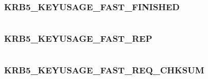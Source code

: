 \documentclass[letterpaper,10pt,english]{sphinxmanual}
\begin{document}
\subsubsection{KRB5\_KEYUSAGE\_FAST\_FINISHED}
\label{appdev/refs/macros/KRB5_KEYUSAGE_FAST_FINISHED:krb5-keyusage-fast-finished-data}\label{appdev/refs/macros/KRB5_KEYUSAGE_FAST_FINISHED::doc}\label{appdev/refs/macros/KRB5_KEYUSAGE_FAST_FINISHED:krb5-keyusage-fast-finished}

\begin{fulllineitems}
\label{appdev/refs/macros/KRB5_KEYUSAGE_FAST_FINISHED:KRB5_KEYUSAGE_FAST_FINISHED}
\end{fulllineitems}


\begin{tabulary}{\linewidth}{|L|L|}
\hline

 & 
\\\hline
\end{tabulary}



\subsubsection{KRB5\_KEYUSAGE\_FAST\_REP}
\label{appdev/refs/macros/KRB5_KEYUSAGE_FAST_REP:krb5-keyusage-fast-rep-data}\label{appdev/refs/macros/KRB5_KEYUSAGE_FAST_REP::doc}\label{appdev/refs/macros/KRB5_KEYUSAGE_FAST_REP:krb5-keyusage-fast-rep}

\begin{fulllineitems}
\label{appdev/refs/macros/KRB5_KEYUSAGE_FAST_REP:KRB5_KEYUSAGE_FAST_REP}
\end{fulllineitems}


\begin{tabulary}{\linewidth}{|L|L|}
\hline

 & 
\\\hline
\end{tabulary}



\subsubsection{KRB5\_KEYUSAGE\_FAST\_REQ\_CHKSUM}
\label{appdev/refs/macros/KRB5_KEYUSAGE_FAST_REQ_CHKSUM:krb5-keyusage-fast-req-chksum-data}\label{appdev/refs/macros/KRB5_KEYUSAGE_FAST_REQ_CHKSUM::doc}\label{appdev/refs/macros/KRB5_KEYUSAGE_FAST_REQ_CHKSUM:krb5-keyusage-fast-req-chksum}
\end{document}
